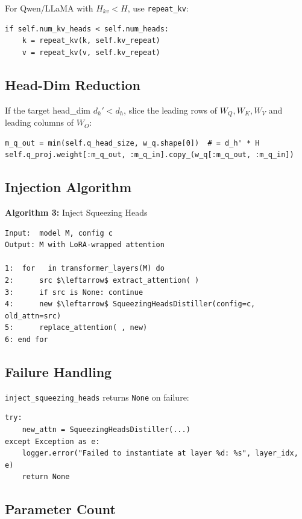 For Qwen/LLaMA with $H_{kv} < H$, use \texttt{repeat\_kv}:

\begin{lstlisting}
if self.num_kv_heads < self.num_heads:
    k = repeat_kv(k, self.kv_repeat)
    v = repeat_kv(v, self.kv_repeat)
\end{lstlisting}

\subsection{Head-Dim Reduction}

If the target head\_dim $d_h' < d_h$, slice the leading rows of $W_Q, W_K, W_V$ 
and leading columns of $W_O$:

\begin{lstlisting}
m_q_out = min(self.q_head_size, w_q.shape[0])  # = d_h' * H
self.q_proj.weight[:m_q_out, :m_q_in].copy_(w_q[:m_q_out, :m_q_in])
\end{lstlisting}

\subsection{Injection Algorithm}

\textbf{Algorithm 3:} Inject Squeezing Heads
\begin{lstlisting}
Input:  model M, config c
Output: M with LoRA-wrapped attention

1:  for   in transformer_layers(M) do
2:      src $\leftarrow$ extract_attention( )
3:      if src is None: continue
4:      new $\leftarrow$ SqueezingHeadsDistiller(config=c, old_attn=src)
5:      replace_attention( , new)
6: end for
\end{lstlisting}

\subsection{Failure Handling}

\texttt{inject\_squeezing\_heads} returns \texttt{None} on failure:

\begin{lstlisting}
try:
    new_attn = SqueezingHeadsDistiller(...)
except Exception as e:
    logger.error("Failed to instantiate at layer %d: %s", layer_idx, e)
    return None
\end{lstlisting}

\subsection{Parameter Count}

